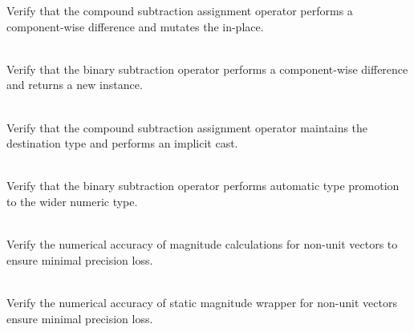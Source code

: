\begin{DoxyRefList}
\label{test__test000022}%
%
Verify that the compound subtraction assignment operator performs a component-\/wise difference and mutates the  in-\/place.  
\item[{\parbox[t]{\linewidth}{Member \doxylink{group___f_g_m___vec4___subtraction_ga36d6f36a32ff65c288a299cd3c682278}{Vector4\+DSubtraction\+\_\+\+Minus\+Operator\+\_\+\+Returns\+Difference} ()}}]\hfill \\
\label{test__test000021}%
%
Verify that the binary subtraction operator performs a component-\/wise difference and returns a new  instance.  
\item[{\parbox[t]{\linewidth}{Member \doxylink{group___f_g_m___vec4___subtraction_ga3214a5bebb22fd262d81d48c175c5c92}{Vector4\+DSubtraction\+\_\+\+Mixed\+Type\+Subtraction\+Assignment\+Does\+Not\+Promote\+Type} ()}}]\hfill \\
\label{test__test000024}%
%
Verify that the compound subtraction assignment operator maintains the destination type and performs an implicit cast.  
\item[{\parbox[t]{\linewidth}{Member \doxylink{group___f_g_m___vec4___subtraction_ga9819b6ebbb4132ac25f6e111c22f5208}{Vector4\+DSubtraction\+\_\+\+Mixed\+Type\+Subtraction\+Promotes\+Type} ()}}]\hfill \\
\label{test__test000023}%
%
Verify that the binary subtraction operator performs automatic type promotion to the wider numeric type.  
\item[{\parbox[t]{\linewidth}{Member \doxylink{group___f_g_m___vec4___magnitude_ga93f5aefd504e25dc166f5f24ebb1c394}{Vector4\+DUnclean\+Magnitude\+\_\+\+Non\+Unit\+Vector\+Returns\+Correct\+Magnitude\+With\+Minimal\+Precision\+Loss} ()}}]\hfill \\
\label{test__test000113}%
%
Verify the numerical accuracy of  magnitude calculations for non-\/unit vectors to ensure minimal precision loss.  
\item[{\parbox[t]{\linewidth}{Member \doxylink{group___f_g_m___vec4___magnitude_ga645fd14ddd6529df29b538e3df6c7834}{Vector4\+DUnclean\+Magnitude\+\_\+\+Static\+Wrapper\+\_\+\+Non\+Unit\+Vector\+Returns\+Correct\+Magnitude\+With\+Minimal\+Precision\+Loss} ()}}]\hfill \\
\label{test__test000114}%
%
Verify the numerical accuracy of  static magnitude wrapper for non-\/unit vectors ensure minimal precision loss. 
\end{DoxyRefList}